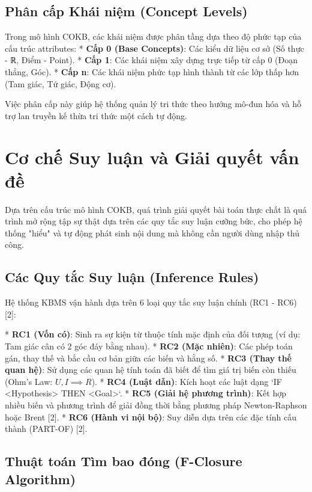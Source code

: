 \subsection{Phân cấp Khái niệm (Concept Levels)}

Trong mô hình COKB, các khái niệm được phân tầng dựa theo độ phức tạp của cấu trúc attributes:
*   \textbf{Cấp 0 (Base Concepts)}: Các kiểu dữ liệu cơ sở (Số thực - ℝ, Điểm - Point).
*   \textbf{Cấp 1}: Các khái niệm xây dựng trực tiếp từ cấp 0 (Đoạn thẳng, Góc).
*   \textbf{Cấp n}: Các khái niệm phức tạp hình thành từ các lớp thấp hơn (Tam giác, Tứ giác, Động cơ).

Việc phân cấp này giúp hệ thống quản lý tri thức theo hướng mô-đun hóa và hỗ trợ lan truyền kế thừa tri thức một cách tự động.

\section{Cơ chế Suy luận và Giải quyết vấn đề}

Dựa trên cấu trúc mô hình COKB, quá trình giải quyết bài toán thực chất là quá trình mở rộng tập sự thật dựa trên các quy tắc suy luận cưỡng bức, cho phép hệ thống "hiểu" và tự động phát sinh nội dung mà không cần người dùng nhập thủ công.

\subsection{Các Quy tắc Suy luận (Inference Rules)}

Hệ thống KBMS vận hành dựa trên 6 loại quy tắc suy luận chính (RC1 - RC6) [2]:

*   \textbf{RC1 (Vốn có)}: Sinh ra sự kiện từ thuộc tính mặc định của đối tượng (ví dụ: Tam giác cân có 2 góc đáy bằng nhau).
*   \textbf{RC2 (Mặc nhiên)}: Các phép toán gán, thay thế và bắc cầu cơ bản giữa các biến và hằng số.
*   \textbf{RC3 (Thay thế quan hệ)}: Sử dụng các quan hệ tính toán đã biết để tìm giá trị biến còn thiếu (Ohm's Law: $U, I \implies R$).
*   \textbf{RC4 (Luật dẫn)}: Kích hoạt các luật dạng `IF <Hypothesis> THEN <Goal>`.
*   \textbf{RC5 (Giải hệ phương trình)}: Kết hợp nhiều biến và phương trình để giải đồng thời bằng phương pháp Newton-Raphson hoặc Brent [2].
*   \textbf{RC6 (Hành vi nội bộ)}: Suy diễn dựa trên các đặc tính cấu thành (PART-OF) [2].

\subsection{Thuật toán Tìm bao đóng (F-Closure Algorithm)}

